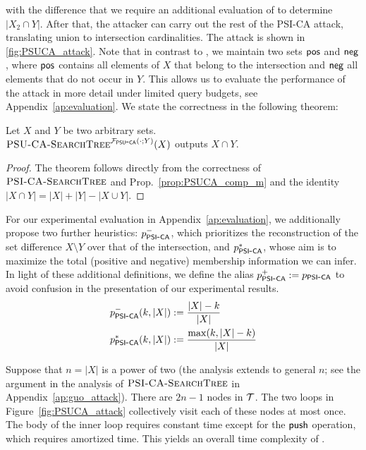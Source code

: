with the difference that we require an additional evaluation of \PSUCA to
determine $|X_2 \cap Y|$.  After that, the attacker can carry out the rest of
the PSI-CA attack, translating union to intersection cardinalities. The attack is shown in
\ref{fig:PSUCA_attack}.  Note that in contrast to \PSICA, we maintain two sets
$\mathsf{pos}$ and $\mathsf{neg}$, where $\mathsf{pos}$ contains all elements of $X$ that
belong to the intersection and $\mathsf{neg}$ all elements that do not occur in
$Y$.  This allows us to evaluate the performance of the attack in more detail
under limited query budgets, see Appendix~\ref{ap:evaluation}.  We state the
correctness in the following theorem:

\begin{theorem}
  Let $X$ and $Y$ be two arbitrary sets. \\
  $\textsc{PSU\mbox{-}CA\mbox{-}SearchTree}^{\mathcal{F}_{\mathsf{PSU\mbox{-}CA}}(\cdot; Y)}(X)$ outputs $X \cap Y$.
\end{theorem}
\begin{proof}
  The theorem follows directly from the correctness of $\textsc{PSI\mbox{-}CA\mbox{-}SearchTree}$ and Prop.~\ref{prop:PSUCA_comp_m} and the identity $|X \cap Y| = |X| + |Y| - |X\cup Y|$.
\end{proof}

For our experimental evaluation in Appendix~\ref{ap:evaluation}, we additionally propose
two further heuristics: $p_{\mathsf{PSI\mbox{-}CA}}^-$, which prioritizes the reconstruction of
the set difference $X \setminus Y$ over that of the intersection, and
$p_{\mathsf{PSI\mbox{-}CA}}^*$, whose aim is to maximize the total (positive and negative)
membership information we can infer.  In light of these additional definitions,
we define the alias $p_{\mathsf{PSI\mbox{-}CA}}^+ := p_{\mathsf{PSI\mbox{-}CA}}$ to avoid confusion in the
presentation of our experimental results.
\begin{align*}
p_{\mathsf{PSI\mbox{-}CA}}^-(k, |X|) &:= \frac{|X| - k}{|X|}\\
p_{\mathsf{PSI\mbox{-}CA}}^*(k, |X|) &:= \frac{\max(k, |X| - k)}{|X|}\end{align*}




 Suppose that $n = |X|$ is a power of two (the analysis extends to general $n$; see the argument in the
analysis of $\textsc{PSI\mbox{-}CA\mbox{-}SearchTree}$ in Appendix~\ref{ap:guo_attack}). There are $2n - 1$ nodes in $\mathcal{T}$.  The two loops in Figure~\ref{fig:PSUCA_attack}
collectively visit each of these nodes at most once.  The body of the inner loop
requires constant time except for the $\mathsf{push}$ operation, which requires
amortized  time.  This yields an overall time complexity of
.

